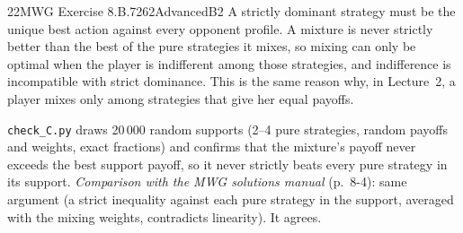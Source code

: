 \begin{exsol}{22}{MWG Exercise 8.B.7}{262}{Advanced}{B2}
\interp A strictly dominant strategy must be the unique best action against every opponent
profile. A mixture is never strictly better than the best of the pure strategies it mixes, so
mixing can only be optimal when the player is indifferent among those strategies, and
indifference is incompatible with strict dominance. This is the same reason why, in Lecture~2,
a player mixes only among strategies that give her equal payoffs.

\verify \texttt{check\_C.py} draws 20\,000 random supports (2--4 pure strategies, random payoffs
and weights, exact fractions) and confirms that the mixture's payoff never exceeds the best
support payoff, so it never strictly beats every pure strategy in its support. \emph{Comparison
with the MWG solutions manual} (p.~8-4): same argument (a strict inequality against each pure
strategy in the support, averaged with the mixing weights, contradicts linearity). It agrees.

\end{exsol}
